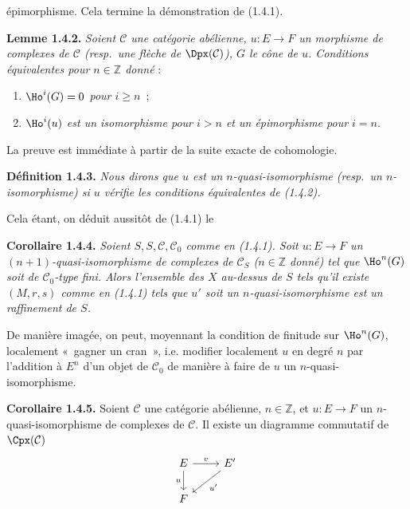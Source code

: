 épimorphisme. Cela termine la démonstration de (1.4.1).

\textbf{Lemme 1.4.2.} \emph{Soient \(\mathcal C\) une catégorie abélienne, \(u:E\to F\) un morphisme de complexes de \(\mathcal C\) (resp.\ une flèche de \(\Dpx(\mathcal C)\)), \(G\) le cône de \(u\). Conditions équivalentes pour \(n\in\mathbb Z\) donné} :
\begin{enumerate}[label=(\roman*)]
\item \emph{\(\Ho^i(G)=0\) pour \(i\geq n\)}~;
\item \emph{\(\Ho^i(u)\) est un isomorphisme pour \(i>n\) et un épimorphisme pour \(i=n\)}.
\end{enumerate}
La preuve est immédiate à partir de la suite exacte de cohomologie.

\textbf{Définition 1.4.3.} \emph{Nous dirons que \(u\) est un \(n\)-quasi-isomorphisme (resp.\ un \(n\)-isomorphisme) si \(u\) vérifie les conditions équivalentes de (1.4.2).}

Cela étant, on déduit aussitôt de (1.4.1) le

\textbf{Corollaire 1.4.4.} \emph{Soient \(S,S,\mathcal C,\mathcal C_0\) comme en (1.4.1). Soit \(u:E\to F\) un \((n+1)\)-quasi-isomorphisme de complexes de \(\mathcal C_S\) (\(n\in\mathbb Z\) donné) tel que \(\Ho^n(G)\) soit de \(\mathcal C_0\)-type fini. Alors l'ensemble des \(X\) au-dessus de \(S\) tels qu'il existe \((M,r,s)\) comme en (1.4.1) tels que \(u'\) soit un \(n\)-quasi-isomorphisme est un raffinement de \(S\).}

De manière imagée, on peut, moyennant la condition de finitude sur \(\Ho^n(G)\), localement «~gagner un cran~», i.e. modifier localement \(u\) en degré \(n\) par l'addition à \(E^n\) d'un objet de \(\mathcal C_0\) de manière à faire de \(u\) un \(n\)-quasi-isomorphisme.

\textbf{Corollaire 1.4.5.} Soient \(\mathcal C\) une catégorie abélienne, \(n\in\mathbb Z\), et \(u:E\to F\) un \(n\)-quasi-isomorphisme de complexes de \(\mathcal C\). Il existe un diagramme commutatif de \(\Cpx(\mathcal C)\)
\[
\begin{tikzcd}
E \arrow[r,"v"] \arrow[d,"u"'] & E' \arrow[dl,"u'"]\\
F &
\end{tikzcd}
\]

